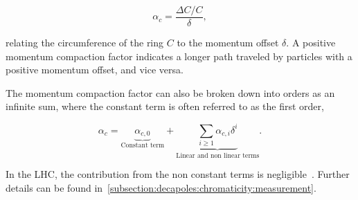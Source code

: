 \begin{equation}
    \alpha_c = \frac{\Delta C / C}{\delta},
\end{equation}

relating the circumference of the ring $C$ to the momentum offset $\delta$.
A positive momentum compaction factor indicates a longer path traveled by particles with a positive
momentum offset, and vice versa.


The momentum compaction factor can also be broken down into orders as an infinite sum, where the
constant term is often referred to as the first order,

\begin{equation}
    \alpha_c = \underbrace{\alpha_{c,0}}_{\text{Constant term}}
               + \underbrace{\sum_{i \geq 1} \alpha_{c, i} \delta^i}_\text{Linear and non linear terms}.
\end{equation}

In the LHC, the contribution from the non constant terms is
negligible~\cite{keintzel_jacqueline_beam_nodate}. Further details can be found
in~\cref{subsection:decapoles:chromaticity:measurement}.